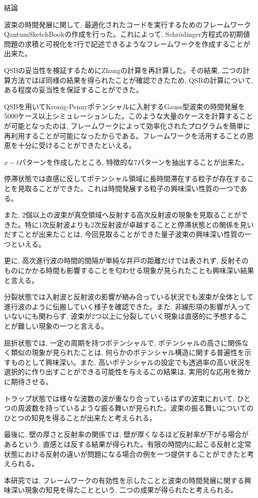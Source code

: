 \documentclass[a4paper, lualatex]{bxjsarticle}
\begin{document}
\begin{section}{結論}
    \par 波束の時間発展に関して, 最適化されたコードを実行するためのフレームワークQantumSketchBookの作成を行った。これによって, Schrödinger方程式の初期値問題の求積と可視化を7行で記述できるようなフレームワークを作成することが出来た。
    \par QSBの妥当性を検証するためにZhangの計算を再計算した。その結果, 二つの計算方法でほぼ同様の結果を得られたことが確認できたため, QSBの計算について, ある程度の妥当性を保証することができた。
    \par QSBを用いてKronig-Pennyポテンシャルに入射するGauss型波束の時間発展を5000ケース以上シミュレーションした。このような大量のケースを計算することが可能となったのは, フレームワークによって効率化されたプログラムを簡単に再利用することが可能になったからである。フレームワークを活用することの恩恵を十分に受けることができたといえる。
    \par $x-t$パターンを作成したところ, 特徴的な7パターンを抽出することが出来た。
    \par 停滞状態では直感に反してポテンシャル領域に長時間滞在する粒子が存在することを見取ることができた。これは時間発展する粒子の興味深い性質の一つである。
    \par また, 2個以上の波束が真空領域へ反射する高次反射波の現象を見取ることができた。特に1次反射波よりも2次反射波が卓越することと停滞状態との関係を見いだすことが出来たことは, 今回見取ることができた量子波束の興味深い性質の一つといえる。
    \par 更に, 高次進行波の時間的間隔が単純な井戸の距離だけでは表されず, 反射そのものにかかる時間も影響することを匂わせる現象が見られたことも興味深い結果と言える。
    \par 分裂状態では入射波と反射波の影響が絡み合っている状況でも波束が全体として進行波のように伝搬していく様子を確認できた。また, 非線形項の影響が入っていないにも関わらず, 波束が2つ以上に分裂していく現象は直感的に予想することが難しい現象の一つと言える。
    \par 屈折状態では, 一定の周期を持つポテンシャルで, ポテンシャルの高さに関係なく類似の現象が見られたことは, 何らかのポテンシャル構造に関する普遍性を示すものとして興味深い。また, 高いポテンシャルの設定でも透過率の高い状況を選択的に作り出すことができる可能性を与えるこの結果は, 実用的な応用を微かに期待させる。
    \par トラップ状態では様々な波数の波が重なり合っているはずの波束において, ひとつの周波数を持っているような振る舞いが見られた。波束の振る舞いについてのひとつの知見を得ることが出来たと考えられる。
    \par 最後に, 壁の厚さと反射率の関係では, 壁が厚くなるほど反射率が下がる場合があるという, 直感とは反する結果が得られた。有限の時間内に起こる反射と定常状態における反射の違いが問題になる場合の例を一つ提供することができたと考えられる。
    \par 本研究では, フレームワークの有効性を示したことと波束の時間発展に関する興味深い現象の知見を得たことという, 二つの成果が得られたと考えられる。
\end{section}
\end{document}
